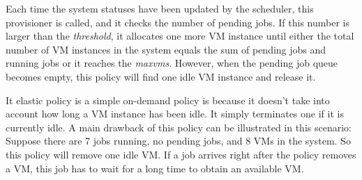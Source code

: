 Each time the system statuses have been updated by the scheduler, this provisioner is called, and it checks the number of pending jobs. If this number is larger than the \emph{threshold}, it allocates one more VM instance until either the total number of VM instances in the system equals the sum of pending jobs and running jobs or it reaches the \emph{maxvms}. However, when the pending job queue becomes empty, this policy will find one idle VM instance and release it.

It elastic policy is a simple on-demand policy is because it doesn't take into account how long a VM instance has been idle. It simply terminates one if it is currently idle. A main drawback of this policy can be illustrated in this scenario: Suppose there are 7 jobs running, no pending jobs, and 8 VMs in the system. So this policy will remove one idle VM. If a job arrives right after the policy removes a VM, this job has to wait for a long time to obtain an available VM.


